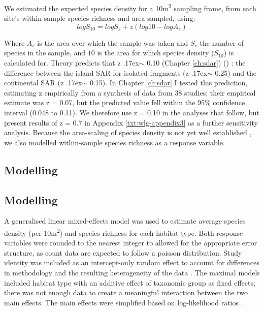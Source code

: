 We estimated the expected species density for a 10m\textsuperscript{2} sampling frame, from each site's within-sample species richness and area sampled, using: 
\begin{equation}
log S_{10} = log S_s + z(log 10 - log A_s)
\end{equation}


Where $A_s$ is the area over which the sample was taken and $S_s$ the number of species in the sample, and $10$ is the area for which species density ($S_{10}$) is calculated for. Theory predicts that z {\raise.17ex\hbox{$\scriptstyle\sim$}} 0.10 
\ifappendixStyle %
(Chapter \ref{ch:sdar})%
\else
(\citealt{Phillips:2015sdar})
\fi
: the difference between the island SAR for isolated fragments (z {\raise.17ex\hbox{$\scriptstyle\sim$}} 0.25) and the continental SAR (z {\raise.17ex\hbox{$\scriptstyle\sim$}} 0.15). 
\ifappendixStyle %
In Chapter \ref{ch:sdar} I %
\else
\cite{Phillips:2015sdar} 
\fi
tested this prediction, estimating z empirically from a synthesis of data from 38 studies; their empirical estimate was z = 0.07, but the predicted value fell within the 95\% confidence interval (0.048 to 0.11). We therefore use z = 0.10 in the analyses that follow, but present results of z = 0.7 in Appendix \ref{txt:wlg-appendix3} as a further sensitivity analysis. Because the area-scaling of species density is not yet well established \citep[e.g.][]{Giladi:2014bio}, we also modelled within-sample species richness as a response variable.

\ifappendixStyle %
\subsection{Modelling}%
\else
\subsection*{Modelling}
\fi

A generalised linear mixed-effects model was used to estimate average species density (per 10m\textsuperscript{2}) and species richness for each habitat type. Both response variables were rounded to the nearest integer to allowed for the appropriate error structure, as count data are expected to follow a poisson distribution. Study identity was included as an intercept-only random effect to account for differences in methodology and the resulting heterogeneity of the data \citep{Zuur:2009me}. The maximal models included habitat type with an additive effect of taxonomic group as fixed effects; there was not enough data to create a meaningful interaction between the two main effects. The main effects were simplified based on log-likelihood ratios \citep{Zuur:2009me,Crawley:2012r}.


